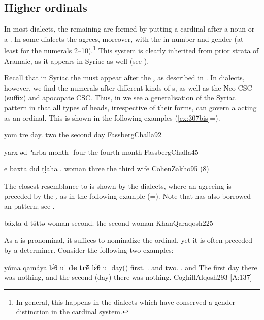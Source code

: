  \subsection{Higher ordinals} \label{ss:NENA_high_ordinals}
 
In most  dialects, the remaining  are formed  by putting a cardinal  after a \cst* noun or a \lnk*. In some dialects the  agrees, moreover, with the  in number and gender (at least for the numerals 2--10).\footnote{In general, this happens in the dialects which have conserved a gender distinction in the cardinal system.} This system is clearly inherited from prior strata of Aramaic, as it appears in Syriac as well (see ).

\largerpage
Recall that in Syriac the  must appear after the \lnk* \d, as described in . In  dialects, however, we find the numerals after different kinds of \lnk*s, as well as the Neo-CSC (\ed suffix) and apocopate CSC. Thus, in  we see a generalisation of the Syriac pattern in that all types of \cst* heads, irrespective of their forms, can govern a  acting as an ordinal. This is shown in the following examples (\ref{ex:307bis}=).

{yom tre}
{day.\cst{} two}
{the second day}
{FassbergChalla}{92} 

{yarx-əd ʾarba}
	{month-\cst{} four}
{the fourth month}
{FassbergChalla}{45}

{ē baxta dīd ṭḷāha}
{.\fem{} woman \lnk{} three}
{the third wife}
{CohenZakho}{95 (8)}

The closest resemblance to \Syr is shown by the \Qar dialects, where an agreeing  is preceded by the \lnk* \d, as in the following example (=). Note that \Qar has also borrowed an  pattern; see .

{báxta d\cb{}  tə́ttə}
{woman \lnk\cb{}  second.\fem}
{the second woman}
{KhanQaraqosh}{225}

As a \lnk* is pronominal, it suffices to nominalize the ordinal, yet it is often preceded by a determiner. Consider the following two \Alq examples:

{yóma qamā́ya lɛ̀θ \cb{}uˈ \textbf{de\cb{}} \textbf{trḗ} lɛ̀θ \cb{}uˈ}
{day(\masc) first.\masc{} \neg.\exist{} \cb{}and \lnk\cb{} two.\masc{} \neg.\exist{} \cb{}and}
{The first day there was nothing, and the second (day) there was nothing.}
{CoghillAlqosh}{293 {[A:137]}}

